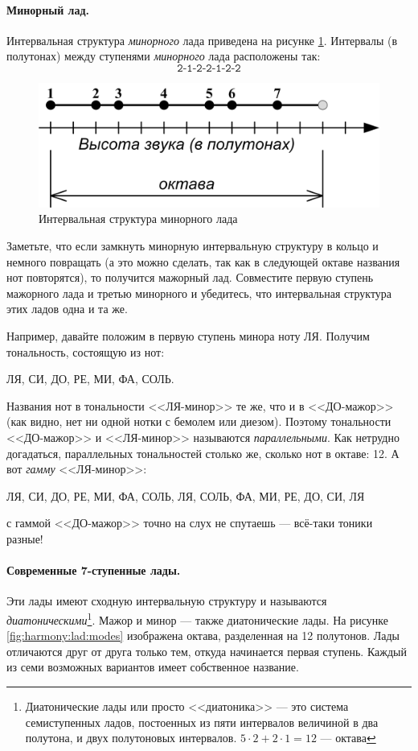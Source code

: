 \paragraph{Минорный лад.} Интервальная структура \emph{минорного} лада приведена на рисунке \ref{fig:harmony:lad:mode:min}. Интервалы (в полутонах) между ступенями \emph{минорного} лада расположены так:
\[
    \texttt{2-1-2-2-1-2-2}
\]

\begin{figure}[!ht]
    \centering
    \includegraphics{fig/intervals/mode-min} 
    \caption{Интервальная структура минорного лада}\label{fig:harmony:lad:mode:min}
\end{figure} 

Заметьте, что если замкнуть минорную интервальную структуру в кольцо и немного повращать (а это можно сделать, так как в следующей октаве названия нот повторятся), то получится мажорный лад. Совместите первую ступень мажорного лада и третью минорного и убедитесь, что интервальная структура этих ладов одна и та же. 

Например, давайте положим в первую ступень минора ноту ЛЯ. Получим тональность, состоящую из нот:
\begin{center}
    ЛЯ, СИ, ДО, РЕ, МИ, ФА, СОЛЬ.
\end{center}

Названия нот в тональности <<ЛЯ-минор>> те же, что и в <<ДО-мажор>> (как видно, нет ни одной нотки с бемолем или диезом). Поэтому тональности <<ДО-мажор>> и <<ЛЯ-минор>> называются \emph{параллельными}. Как нетрудно догадаться, параллельных тональностей столько же, сколько нот в октаве: 12. А вот \emph{гамму} <<ЛЯ-минор>>:
\begin{center}
    ЛЯ, СИ, ДО, РЕ, МИ, ФА, СОЛЬ, ЛЯ, СОЛЬ, ФА, МИ, РЕ, ДО, СИ, ЛЯ
\end{center}
с гаммой <<ДО-мажор>> точно на слух не спутаешь --- всё-таки тоники разные!

\paragraph{Современные 7-ступенные лады.} Эти лады имеют сходную интервальную структуру и называются \emph{диатоническими}\footnote{Диатонические лады или просто <<диатоника>> --- это система семиступенных ладов, постоенных из пяти интервалов величиной в два полутона, и двух полутоновых интервалов. $5\cdot2 + 2\cdot 1 = 12$ --- октава}. Мажор и минор --- также диатонические лады. На рисунке \ref{fig:harmony:lad:modes} изображена октава, разделенная на 12 полутонов. Лады отличаются друг от друга только тем, откуда начинается первая ступень. Каждый из семи возможных вариантов имеет собственное название. 

